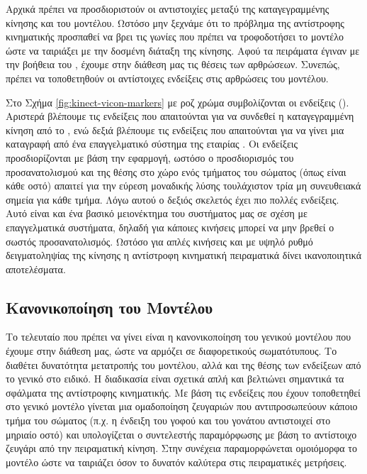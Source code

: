 Αρχικά πρέπει να προσδιοριστούν οι αντιστοιχίες μεταξύ της καταγεγραμμένης κίνησης και του μοντέλου. Ωστόσο μην ξεχνάμε ότι το πρόβλημα της αντίστροφης κινηματικής προσπαθεί να βρει τις γωνίες που πρέπει να τροφοδοτήσει το μοντέλο ώστε να ταιριάξει με την δοσμένη διάταξη της κίνησης. Αφού τα πειράματα έγιναν με την βοήθεια του , έχουμε στην διάθεση μας τις θέσεις των αρθρώσεων. Συνεπώς, πρέπει να τοποθετηθούν οι αντίστοιχες ενδείξεις στις αρθρώσεις του μοντέλου.

Στο Σχήμα \ref{fig:kinect-vicon-markers} με ροζ χρώμα συμβολίζονται οι ενδείξεις (). Αριστερά βλέπουμε τις ενδείξεις που απαιτούνται για να συνδεθεί η καταγεγραμμένη κίνηση από το , ενώ δεξιά βλέπουμε τις ενδείξεις που απαιτούνται για να γίνει μια καταγραφή από ένα επαγγελματικό σύστημα της εταιρίας . Οι ενδείξεις προσδιορίζονται με βάση την εφαρμογή, ωστόσο ο προσδιορισμός του προσανατολισμού και της θέσης στο χώρο ενός τμήματος του σώματος (όπως είναι κάθε οστό) απαιτεί για την εύρεση μοναδικής λύσης τουλάχιστον τρία μη συνευθειακά σημεία για κάθε τμήμα. Λόγω αυτού ο δεξιός σκελετός έχει πιο πολλές ενδείξεις. Αυτό είναι και ένα βασικό μειονέκτημα του συστήματος μας σε σχέση με επαγγελματικά συστήματα, δηλαδή για κάποιες κινήσεις μπορεί να μην βρεθεί ο σωστός προσανατολισμός. Ωστόσο για απλές κινήσεις και με υψηλό ρυθμό δειγματοληψίας της κίνησης η αντίστροφη κινηματική πειραματικά δίνει ικανοποιητικά αποτελέσματα.

\subsection{Κανονικοποίηση του Μοντέλου}

Το τελευταίο που πρέπει να γίνει είναι η κανονικοποίηση του γενικού μοντέλου που έχουμε στην διάθεση μας, ώστε να αρμόζει σε διαφορετικούς σωματότυπους. Το  διαθέτει δυνατότητα μετατροπής του μοντέλου, αλλά και της θέσης των ενδείξεων από το γενικό στο ειδικό. Η διαδικασία είναι σχετικά απλή και βελτιώνει σημαντικά τα σφάλματα της αντίστροφης κινηματικής. Με βάση τις ενδείξεις που έχουν τοποθετηθεί στο γενικό μοντέλο γίνεται μια ομαδοποίηση ζευγαριών που αντιπροσωπεύουν κάποιο τμήμα του σώματος (π.χ. η ένδειξη του γοφού και του γονάτου αντιστοιχεί στο μηριαίο οστό) και υπολογίζεται ο συντελεστής παραμόρφωσης με βάση το αντίστοιχο ζευγάρι από την πειραματική κίνηση. Στην συνέχεια παραμορφώνεται ομοιόμορφα το μοντέλο ώστε να ταιριάζει όσον το δυνατόν καλύτερα στις πειραματικές μετρήσεις.

